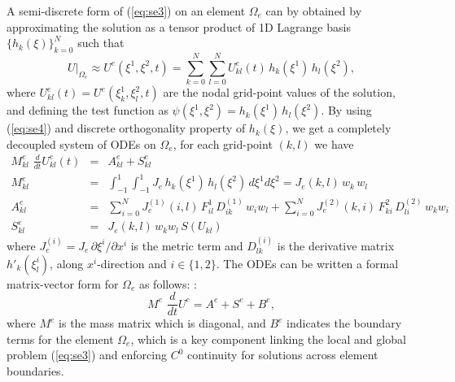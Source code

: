   A semi-discrete  form of  (\ref{eq:se3})  on an  element $\Omega_e$ can by obtained by
   approximating the solution  as a tensor product of  1D Lagrange basis  $\{ h_k(\xi)\}_{k=0}^N$ such that
 \begin{equation}
     U |_{\Omega_e} \approx  U^e(\xi^1,\xi^2,t) =  \sum_{k=0}^{N}   \sum_{l=0}^{N}  U^e_{kl}(t)  \, h_k(\xi^1) \, h_l(\xi^2), 
 \end{equation}
 where $U^e_{kl}(t) = U^e(\xi_k^1, \xi_l^2,t) $ are  the nodal grid-point values of the solution, and  defining the  test function as
  $\psi(\xi^1,\xi^2) = h_k(\xi^1) \, h_l(\xi^2)$. By using (\ref{eq:se4}) and discrete orthogonality property of $h_k(\xi)$, 
  we get a completely decoupled system of ODEs on  $\Omega_e$,  for each grid-point $(k,l)$  we have 
  \begin{eqnarray}
      M^e_{kl}\, \, \frac{d }{dt} U^e_{kl}(t) &= &  A^e_{kl}    + S^e_{kl}  \\
        M^e_{kl}  &=  & \int_{-1}^{1} \int_{-1}^{1} J_e  \, h_k(\xi^1)  \, h_l(\xi^2) \, d\xi^1  d\xi^2 = J_e(k,l) \, w_k \, w_l \\
          A^e_{kl}  &=  & \sum_{i=0}^N  J^{(1)}_e(i,l) \,  F^1_{i l} \, D_{ik}^{(1)}\, w_i  w_l  +
           \sum_{i=0}^N  J^{(2)}_e(k, i) \,  F^2_{k i} \, D_{l i}^{(2)} \, w_k  w_i \\
           S^e_{kl}  &=   &J_e(k,l) \, w_k w_l  \, S(U_{kl})
  \end{eqnarray}  
   where $J^{(i)}_e = J_e \,\partial \xi^i / \partial x^i$ is the metric term  and 
   $D^{(i)}_{lk}$ is the  derivative matrix $h'_k(\xi^i_l)$, 
  along $x^i$-direction and  $ i \in \{1,  2\}$.  The ODEs can be written a formal matrix-vector form
  for  $\Omega_e$  as follows:
  \cite{KS2013book}: 
 \begin{equation}
    M^e\, \, \frac{d }{dt} U^e =   A^e    + S^e + B^e,  \label{eq:se7}
 \end{equation}
      where $M^e$ is the mass matrix which  is diagonal,  and $B^e$
  indicates the boundary terms for the element 
  $\Omega_e$, which is a key component linking  the local and global problem (\ref{eq:se3}) and enforcing $C^0$ continuity
  for solutions across element boundaries.  
  
